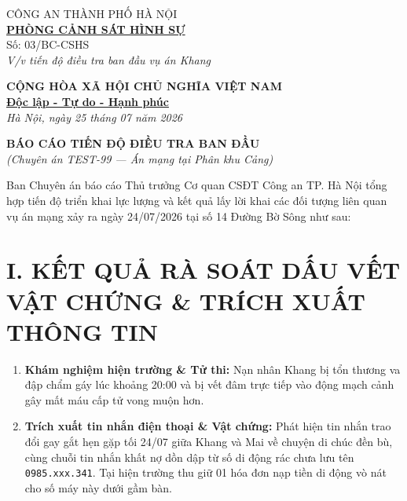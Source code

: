 \documentclass[12pt,a4paper]{article}
\begin{document}
\noindent
\begin{minipage}[t]{0.45\textwidth}
    \begin{center}
        \small
        CÔNG AN THÀNH PHỐ HÀ NỘI\\
        \textbf{\underline{PHÒNG CẢNH SÁT HÌNH SỰ}}\\[0.1cm]
        Số: 03/BC-CSHS\\
        \textit{V/v tiến độ điều tra ban đầu vụ án Khang}
    \end{center}
\end{minipage}
\hfill
\begin{minipage}[t]{0.52\textwidth}
    \begin{center}
        \small
        \textbf{CỘNG HÒA XÃ HỘI CHỦ NGHĨA VIỆT NAM}\\
        \textbf{\underline{Độc lập - Tự do - Hạnh phúc}}\\[0.1cm]
        \textit{Hà Nội, ngày 25 tháng 07 năm 2026}
    \end{center}
\end{minipage}

\vspace{0.6cm}

\begin{center}
    \textbf{\large BÁO CÁO TIẾN ĐỘ ĐIỀU TRA BAN ĐẦU}\\
    \textit{(Chuyên án TEST-99 — Án mạng tại Phân khu Cảng)}
\end{center}

\vspace{0.3cm}

\noindent Ban Chuyên án báo cáo Thủ trưởng Cơ quan CSĐT Công an TP. Hà Nội tổng hợp tiến độ triển khai lực lượng và kết quả lấy lời khai các đối tượng liên quan vụ án mạng xảy ra ngày 24/07/2026 tại số 14 Đường Bờ Sông như sau:

\section*{I. KẾT QUẢ RÀ SOÁT DẤU VẾT VẬT CHỨNG \& TRÍCH XUẤT THÔNG TIN}
\begin{enumerate}[label=\arabic*., leftmargin=1.5cm]
    \item \textbf{Khám nghiệm hiện trường \& Tử thi:} Nạn nhân Khang bị tổn thương va đập chẩm gáy lúc khoảng 20:00 và bị vết đâm trực tiếp vào động mạch cảnh gây mất máu cấp tử vong muộn hơn.
    \item \textbf{Trích xuất tin nhắn điện thoại \& Vật chứng:} Phát hiện tin nhắn trao đổi gay gắt hẹn gặp tối 24/07 giữa Khang và Mai về chuyện di chúc đền bù, cùng chuỗi tin nhắn khất nợ dồn dập từ số di động rác chưa lưu tên \texttt{0985.xxx.341}. Tại hiện trường thu giữ 01 hóa đơn nạp tiền di động vò nát cho số máy này dưới gầm bàn.
\end{enumerate}
\end{document}
